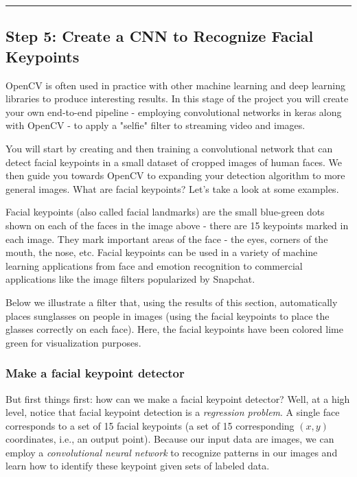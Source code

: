 \documentclass[11pt]{article}
\begin{document}
    \begin{center}\rule{0.5\linewidth}{\linethickness}\end{center}

\subsection{Step 5: Create a CNN to Recognize Facial
Keypoints}\label{step-5-create-a-cnn-to-recognize-facial-keypoints}

OpenCV is often used in practice with other machine learning and deep
learning libraries to produce interesting results. In this stage of the
project you will create your own end-to-end pipeline - employing
convolutional networks in keras along with OpenCV - to apply a "selfie"
filter to streaming video and images.

You will start by creating and then training a convolutional network
that can detect facial keypoints in a small dataset of cropped images of
human faces. We then guide you towards OpenCV to expanding your
detection algorithm to more general images. What are facial keypoints?
Let's take a look at some examples.

Facial keypoints (also called facial landmarks) are the small blue-green
dots shown on each of the faces in the image above - there are 15
keypoints marked in each image. They mark important areas of the face -
the eyes, corners of the mouth, the nose, etc. Facial keypoints can be
used in a variety of machine learning applications from face and emotion
recognition to commercial applications like the image filters
popularized by Snapchat.

Below we illustrate a filter that, using the results of this section,
automatically places sunglasses on people in images (using the facial
keypoints to place the glasses correctly on each face). Here, the facial
keypoints have been colored lime green for visualization purposes.

    \subsubsection{Make a facial keypoint
detector}\label{make-a-facial-keypoint-detector}

But first things first: how can we make a facial keypoint detector?
Well, at a high level, notice that facial keypoint detection is a
\emph{regression problem}. A single face corresponds to a set of 15
facial keypoints (a set of 15 corresponding \((x, y)\) coordinates,
i.e., an output point). Because our input data are images, we can employ
a \emph{convolutional neural network} to recognize patterns in our
images and learn how to identify these keypoint given sets of labeled
data.
\end{document}
